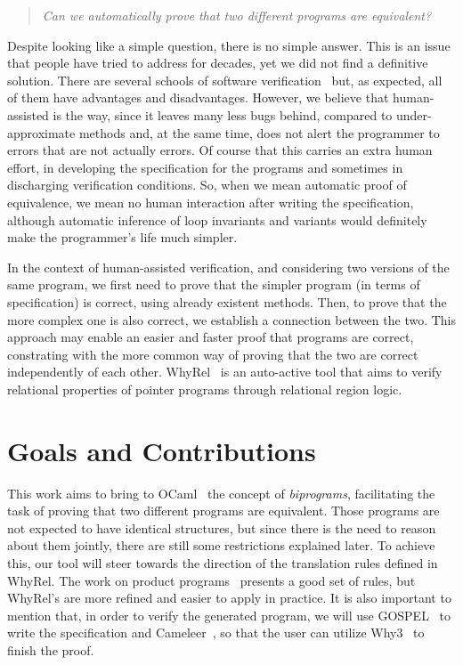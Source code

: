 \begin{quote}
    \centering
    \emph{Can we automatically prove that two different programs are equivalent?}
\end{quote}

Despite looking like a simple question, there is no simple answer.
This is an issue that people have tried to address for decades, yet we did not find a definitive solution.
There are several schools of software verification~\cite{DBLP:conf/fm/BrainP24} but, as expected, all of them have advantages and disadvantages.
However, we believe that human-assisted is the way, since it leaves many less bugs behind, compared to under-approximate methods and, at the same time, does not alert the programmer to errors that are not actually errors.
Of course that this carries an extra human effort, in developing the specification for the programs and sometimes in discharging verification conditions.
So, when we mean automatic proof of equivalence, we mean no human interaction after writing the specification, although automatic inference of loop invariants and variants would definitely make the programmer's life much simpler.

In the context of human-assisted verification, and considering two versions of the same program, we first need to prove that the simpler program (in terms of specification) is correct, using already existent methods.
Then, to prove that the more complex one is also correct, we establish a connection between the two.
This approach may enable an easier and faster proof that programs are correct, constrating with the more common way of proving that the two are correct independently of each other. 
WhyRel~\cite{whyrel} is an auto-active tool that aims to verify relational properties of pointer programs through relational region logic.


\section{Goals and Contributions}

This work aims to bring to OCaml~\cite{ocaml} the concept of \emph{biprograms}, facilitating the task of proving that two different programs are equivalent.
Those programs are not expected to have identical structures, but since there is the need to reason about them jointly, there are still some restrictions explained later.
To achieve this, our tool will steer towards the direction of the translation rules defined in WhyRel.
The work on product programs~\cite{DBLP:conf/fm/BartheCK11} presents a good set of rules, but WhyRel's are more refined and easier to apply in practice.
It is also important to mention that, in order to verify the generated program, we will use GOSPEL~\cite{DBLP:conf/fm/ChargueraudFLP19} to write the specification and Cameleer~\cite{DBLP:conf/cav/PereiraR20}, so that the user can utilize Why3~\cite{why3} to finish the proof.

